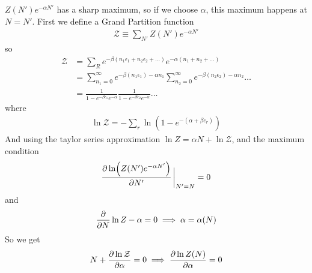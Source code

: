 \documentclass[../main.tex]{subfiles}
\begin{document}
$Z(N') e^{-\alpha N'}$ has a sharp maximum, so if we choose $\alpha$, this maximum happens at
$N = N'$. First we define a Grand Partition function
\begin{align*}
    \mathcal{Z} \equiv \sum_{N'} Z(N') e^{-\alpha N'}
\end{align*}
so
\begin{align*}
    \mathcal{Z} &= \sum_R e^{-\beta(n_1 \epsilon_1 + n_2 \epsilon_2 + \dots)} e^{-\alpha (n_1 + n_2 + \dots)} \\
    &= \sum_{n_1 = 0}^\infty e^{-\beta(n_1 \epsilon_1) - \alpha n_1} \sum_{n_2 = 0}^\infty e^{-\beta(n_2 \epsilon_2) - \alpha n_2} \dots \\
    &= \frac{1}{1 - e^{-\beta \epsilon_1} e^{-\alpha}} \frac{1}{1 - e^{-\beta \epsilon_2} e^{-\alpha}} \dots
\end{align*}
where
\begin{align*}
    \ln \mathcal{Z} = - \sum_r \ln(1 - e^{-(\alpha + \beta e_r)})
\end{align*}
And using the taylor series approximation $\ln Z = \alpha N + \ln \mathcal{Z}$, and the maximum condition
\begin{align*}
    \pdv{\ln(Z(N') e^{-\alpha N'})}{N'}\eval_{N' = N} = 0
\end{align*}
and
\begin{align*}
    \pdv{N} \ln Z - \alpha = 0 \implies \alpha = \alpha(N)
\end{align*}
So we get
\begin{align*}
    N + \pdv{\ln\mathcal{Z}}{\alpha} = 0 \implies \pdv{\ln{Z(N)}}{\alpha} = 0
\end{align*}
\end{document}
